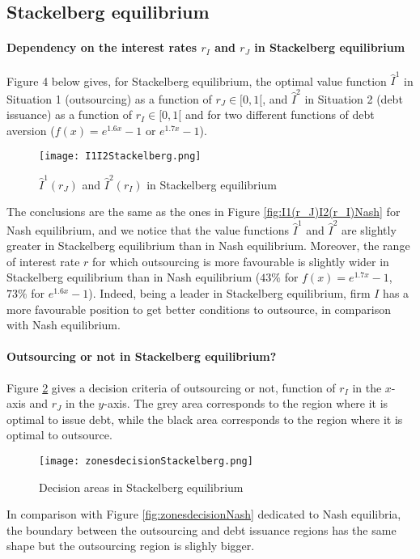 \documentclass{svjour3}
\begin{document}
\newpage

\subsection{Stackelberg equilibrium}
\label{figStackelberg}

\paragraph{Dependency on the interest rates $r_I$ and $r_J$ in Stackelberg equilibrium}
Figure 4 below gives, for Stackelberg equilibrium,  the optimal value function $\hat{I}^1$ in Situation 1 (outsourcing) as a function of $r_J \in [0,1[$,  and $\hat{I}^2$ in Situation 2 (debt issuance) as a function of $r_I \in [0,1[$ and for two different functions of debt aversion ($f(x) = e^{1.6 x} - 1$  or  $e^{1.7 x} - 1$).
\begin{figure}[ht]
    \begin{center}
    \texttt{[image: I1I2Stackelberg.png]}
  \caption{$\hat{I}^1(r_J)$ and $\hat{I}^2(r_I)$ in Stackelberg equilibrium}
\end{center}
\label{fig:**}
\end{figure}
The conclusions are the same as the ones in Figure \ref{fig:I1(r_J)I2(r_I)Nash} for Nash equilibrium, and
we notice that the value functions $\hat{I}^1$ and $\hat{I}^2$ are  slightly greater in Stackelberg equilibrium than  in Nash equilibrium. Moreover, the range of interest rate $r$ for which outsourcing is  more favourable is slightly wider in Stackelberg equilibrium than in Nash equilibrium ($43\%$ for $f(x) = e^{1.7 x} - 1$,   $73\%$  for $e^{1.6 x} - 1$). Indeed, being a leader in Stackelberg equilibrium, firm $I$ has a more favourable position to get better conditions to outsource, in comparison with Nash  equilibrium.

\paragraph{Outsourcing or not in Stackelberg equilibrium?}
Figure \ref{fig:zonesdecisionStackelberg} gives a decision criteria of outsourcing or not, function of $r_I$ in the $x$-axis and $r_J$ in the $y$-axis. The grey area corresponds to the region where it is optimal to issue debt, while the black area corresponds to the region where it is optimal to outsource. 
\begin{figure}[ht]
    \centering
    \texttt{[image: zonesdecisionStackelberg.png]}
    \caption{Decision areas in Stackelberg equilibrium}
    \label{fig:zonesdecisionStackelberg}
\end{figure}
In comparison with Figure \ref{fig:zonesdecisionNash} dedicated to Nash equilibria, the boundary between the outsourcing and debt issuance regions has the same shape but the outsourcing region is slighly bigger.
\end{document}
